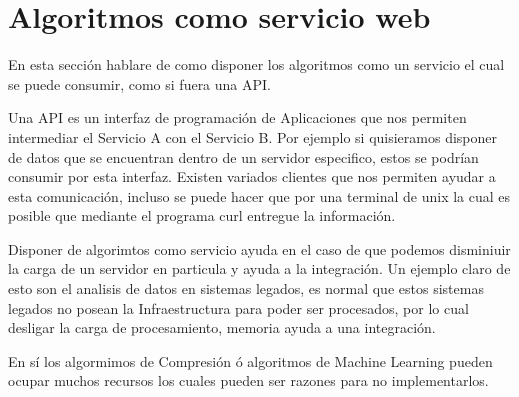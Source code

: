 \section{Algoritmos como servicio web }


  En esta sección hablare de como disponer los algoritmos como un servicio el cual se puede consumir, como si fuera una API.

  Una API es un interfaz de programación de Aplicaciones que nos permiten intermediar el Servicio A con el Servicio B.
  Por ejemplo si quisieramos disponer de datos que se encuentran dentro de un servidor especifico, estos se podrían consumir por esta interfaz. Existen variados clientes que nos permiten ayudar a esta comunicación, incluso se puede hacer que por una terminal de unix la cual es posible que mediante el programa curl entregue la información.

  Disponer de algorimtos como servicio ayuda en el caso de que podemos disminiuir la carga de un servidor en particula y ayuda a la integración. Un ejemplo claro de esto son el analisis de datos en sistemas legados, es normal que estos sistemas legados no posean la Infraestructura para poder ser procesados, por lo cual desligar la carga de procesamiento, memoria ayuda a una integración.

  En sí los algormimos de Compresión ó algoritmos de Machine Learning pueden ocupar muchos recursos los cuales pueden ser razones para no implementarlos.